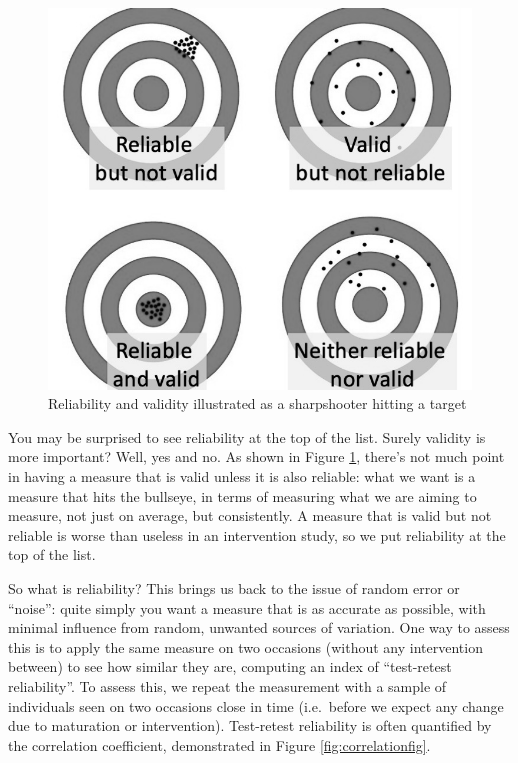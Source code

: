 \documentclass{krantz}
\begin{document}
\begin{figure}
\includegraphics[width=0.5\linewidth]{images_bw/targets} \caption{Reliability and validity illustrated as a sharpshooter hitting a target}\label{fig:darts}
\end{figure}

You may be surprised to see reliability at the top of the list. Surely validity is more important? Well, yes and no. As shown in Figure \ref{fig:darts}, there's not much point in having a measure that is valid unless it is also reliable: what we want is a measure that hits the bullseye, in terms of measuring what we are aiming to measure, not just on average, but consistently. A measure that is valid but not reliable is worse than useless in an intervention study, so we put reliability at the top of the list.

So what is reliability? This brings us back to the issue of random error or ``noise'': quite simply you want a measure that is as accurate as possible, with minimal influence from random, unwanted sources of variation. One way to assess this is to apply the same measure on two occasions (without any intervention between) to see how similar they are, computing an index of ``test-retest reliability''. To assess this, we repeat the measurement with a sample of individuals seen on two occasions close in time (i.e.~before we expect any change due to maturation or intervention). Test-retest reliability is often quantified by the correlation coefficient, demonstrated in Figure \ref{fig:correlationfig}.
\end{document}
